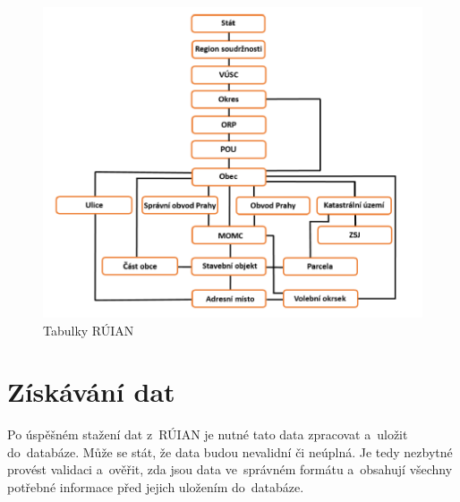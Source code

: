 \begin{figure}[ht]
    \centering
    \includegraphics[width=\textwidth]{figures/ruian_tables.png}
    \caption{Tabulky RÚIAN}
    \label{fig:ruian_tables}
\end{figure}

\section{Získávání dat}
Po úspěšném stažení dat z~RÚIAN je nutné tato data zpracovat a~uložit do~databáze.
Může se stát, že data budou nevalidní či neúplná. Je tedy nezbytné provést
validaci a~ověřit, zda jsou data ve~správném formátu a~obsahují všechny potřebné
informace před jejich uložením do~databáze.